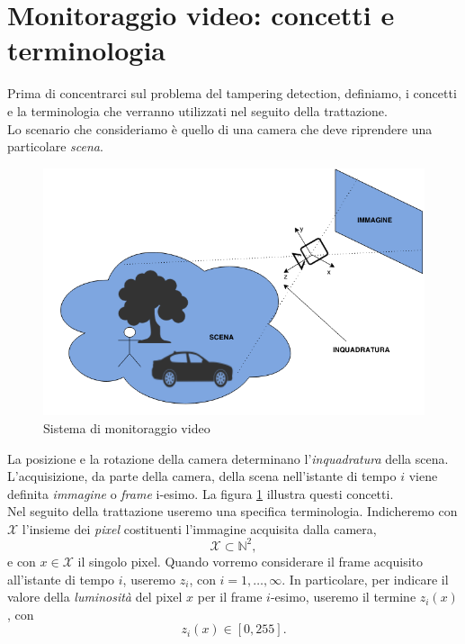 \section{Monitoraggio video: concetti e terminologia}
Prima di concentrarci sul problema del tampering detection, definiamo, i concetti e la terminologia che verranno utilizzati nel seguito della trattazione.\\
Lo scenario che consideriamo \`e quello di una camera che deve riprendere una particolare \textit{\gls{scena}}.
\begin{figure}
	\centering
	\includegraphics[width=12cm]{./pictures/videoMonitoring}
	\caption{Sistema di monitoraggio video}
	\label{fig:videoMonitoring}
\end{figure}
\noindent 
La posizione e la rotazione della camera determinano l'\textit{\gls{inquadratura}} della scena.
L'acquisizione, da parte della camera, della scena nell'istante di tempo $i$ viene definita \textit{immagine} o \textit{frame} i-esimo.
La figura \ref{fig:videoMonitoring} illustra questi concetti.\\
Nel seguito della trattazione useremo una specifica terminologia.
Indicheremo con $\mathcal{X}$ l'insieme dei \textit{pixel} costituenti l'immagine acquisita dalla camera,
\[ \mathcal{X} \subset \mathbb{N}^2, \]
e con $x \in \mathcal{X}$ il singolo pixel.
Quando vorremo considerare il frame acquisito all'istante di tempo $i$, useremo $z_i$, con $i=1,\dots , \infty$. 
In particolare, per indicare il valore della \textit{luminosit\`a} del pixel $x$ per il frame $i$-esimo, useremo il termine $z_i(x)$, con 
\[ z_i(x) \in [0, 255]. \]
